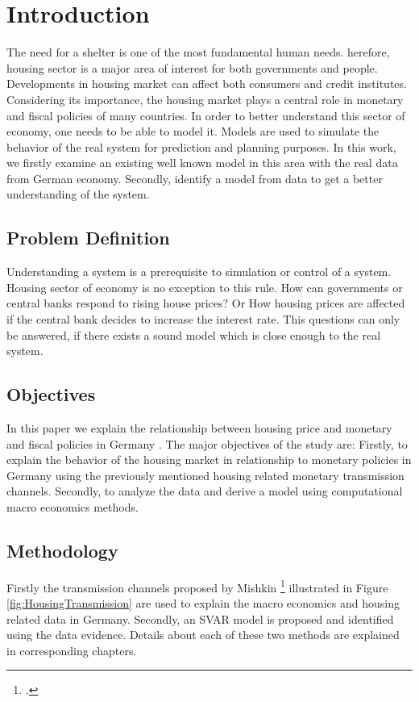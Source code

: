\section{Introduction} \label{introduction}

The need for a shelter is one of the most fundamental human needs. herefore, housing sector is a major area of interest for both governments and people. Developments in housing market can affect both consumers and credit institutes. Considering its importance, the housing market plays a central role in monetary and fiscal policies of many countries. In order to better understand this sector of economy, one needs to be able to model it. Models are used to simulate the behavior of the real system for prediction and planning purposes. In this work, we firstly examine an existing well known model in this area with the real data from German economy. Secondly, identify a model from data to get a better understanding of the system.

\subsection{Problem Definition}
Understanding a system is a prerequisite to simulation or control of a system. Housing sector of economy is no exception to this rule. How can governments or central banks respond to  rising house prices? Or How housing prices are affected if the central bank decides to increase the interest rate. This questions can only be answered, if there exists a sound model which is close enough to the real system.


\subsection{Objectives}
In this paper we explain the relationship between housing price and monetary and fiscal policies in Germany .
The major objectives of the study are: Firstly, to explain the behavior of the housing market in relationship to monetary policies in Germany using the previously mentioned housing related monetary transmission channels. Secondly, to analyze the data and derive a model using computational macro economics methods. 

\subsection{Methodology}
Firstly the transmission channels proposed by Mishkin \footcite[See.][]{Mishkin2007} illustrated in Figure \ref{fig:HousingTransmission} are used to explain the macro economics and housing related data in Germany. Secondly, an \ac{SVAR} model is proposed and identified using the data evidence. Details about each of these two methods are explained in corresponding chapters.




